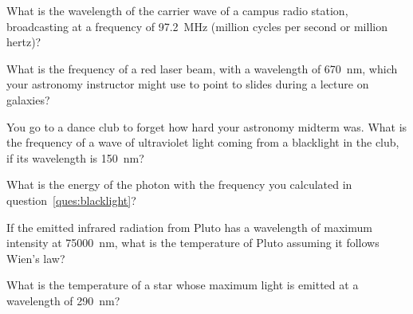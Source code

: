 \documentclass[addpoints]{exam}
\begin{document}
\begin{questions}
\question
What is the wavelength of the carrier wave of a campus radio station, broadcasting at a frequency of \SI{97.2}{MHz} (million cycles per second or million hertz)?

\question
What is the frequency of a red laser beam, with a wavelength of \SI{670}{nm}, which your astronomy instructor might use to point to slides during a lecture on galaxies?

\question \label{ques:blacklight}
You go to a dance club to forget how hard your astronomy midterm was. What is the frequency of a wave of ultraviolet light coming from a blacklight in the club, if its wavelength is \SI{150}{nm}?

\question
What is the energy of the photon with the frequency you calculated in question~\ref{ques:blacklight}?

\question
If the emitted infrared radiation from Pluto has a wavelength of maximum intensity at \SI{75000}{nm}, what is the temperature of Pluto assuming it follows Wien's law?

\question
What is the temperature of a star whose maximum light is emitted at a wavelength of \SI{290}{nm}?



\end{questions}
\end{document}
